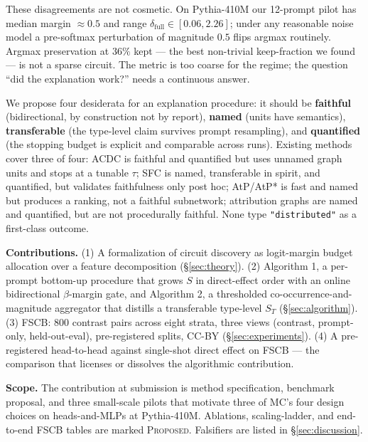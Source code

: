 \documentclass[10pt]{article}
\begin{document}
These disagreements are not cosmetic. On Pythia-410M our 12-prompt pilot has median margin $\approx 0.5$ and range $\delta_{\text{full}} \in [0.06, 2.26]$; under any reasonable noise model a pre-softmax perturbation of magnitude $0.5$ flips argmax routinely. Argmax preservation at $36\%$ kept --- the best non-trivial keep-fraction we found --- is not a sparse circuit. The metric is too coarse for the regime; the question ``did the explanation work?'' needs a continuous answer.

We propose four desiderata for an explanation procedure: it should be \textbf{faithful} (bidirectional, by construction not by report), \textbf{named} (units have semantics), \textbf{transferable} (the type-level claim survives prompt resampling), and \textbf{quantified} (the stopping budget is explicit and comparable across runs). Existing methods cover three of four: ACDC \citep{conmy2023acdc} is faithful and quantified but uses unnamed graph units and stops at a tunable $\tau$; SFC \citep{marks2024sparse} is named, transferable in spirit, and quantified, but validates faithfulness only post hoc; AtP/AtP* \citep{syed2024attribution,kramar2024atp} is fast and named but produces a ranking, not a faithful subnetwork; attribution graphs \citep{ameisen2025circuit,lindsey2025biology} are named and quantified, but are not procedurally faithful. None type \texttt{"distributed"} as a first-class outcome.

\textbf{Contributions.} (1) A formalization of circuit discovery as logit-margin budget allocation over a feature decomposition (\S\ref{sec:theory}). (2) Algorithm 1, a per-prompt bottom-up procedure that grows $S$ in direct-effect order with an online bidirectional $\beta$-margin gate, and Algorithm 2, a thresholded co-occurrence-and-magnitude aggregator that distills a transferable type-level $S_T$ (\S\ref{sec:algorithm}). (3) FSCB: 800 contrast pairs across eight strata, three views (contrast, prompt-only, held-out-eval), pre-registered splits, CC-BY (\S\ref{sec:experiments}). (4) A pre-registered head-to-head against single-shot direct effect on FSCB --- the comparison that licenses or dissolves the algorithmic contribution.

\textbf{Scope.} The contribution at submission is method specification, benchmark proposal, and three small-scale pilots that motivate three of MC's four design choices on heads-and-MLPs at Pythia-410M. Ablations, scaling-ladder, and end-to-end FSCB tables are marked \textsc{Proposed}. Falsifiers are listed in \S\ref{sec:discussion}.
\end{document}
